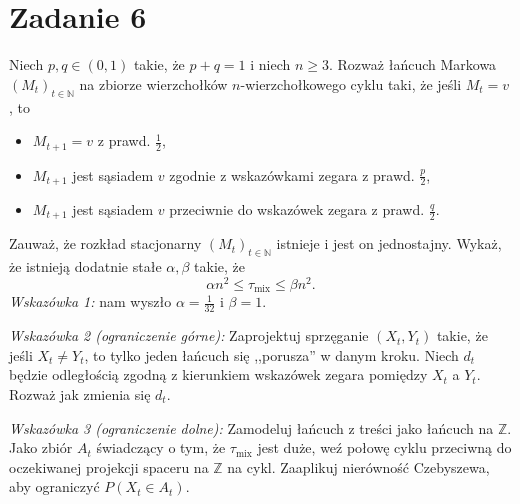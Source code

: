 \section[\nierozwiazane{Zadanie 6}]{Zadanie 6}
Niech \(p, q \in (0, 1)\) takie, że \(p + q = 1\) i niech \(n \geqslant 3\). Rozważ łańcuch Markowa
\((M_t)_{t \in \mathbb{N}}\) na zbiorze wierzchołków \(n\)-wierzchołkowego cyklu taki, że jeśli \(M_t = v\), to
\begin{itemize}
	\item \(M_{t+1} = v\) z prawd. \(\frac{1}{2}\),
	\item \(M_{t+1}\) jest sąsiadem \(v\) zgodnie z wskazówkami zegara z prawd. \(\frac{p}{2}\),
	\item \(M_{t+1}\) jest sąsiadem \(v\) przeciwnie do wskazówek zegara z prawd. \(\frac{q}{2}\).
\end{itemize}
Zauważ, że rozkład stacjonarny \((M_t)_{t \in \mathbb{N}}\) istnieje i jest on jednostajny. Wykaż, że istnieją
dodatnie stałe \(\alpha, \beta\) takie, że
\[
	\alpha n^2 \leqslant \tau_{\text{mix}} \leqslant \beta n^2.
\]
\textit{Wskazówka 1:} nam wyszło \(\alpha = \frac{1}{32}\) i \(\beta = 1\).

\textit{Wskazówka 2 (ograniczenie górne):} Zaprojektuj sprzęganie \((X_t, Y_t)\) takie, że jeśli \(X_t \neq Y_t\),
to tylko jeden łańcuch się ,,porusza'' w danym kroku. Niech \(d_t\) będzie odległością zgodną
z kierunkiem wskazówek zegara pomiędzy \(X_t\) a \(Y_t\). Rozważ jak zmienia się \(d_t\).

\textit{Wskazówka 3 (ograniczenie dolne):} Zamodeluj łańcuch z treści jako łańcuch na \(\mathbb{Z}\). Jako
zbiór \(A_t\) świadczący o tym, że \(\tau_{\text{mix}}\) jest duże, weź połowę cyklu przeciwną do oczekiwanej
projekcji spaceru na \(\mathbb{Z}\) na cykl. Zaaplikuj nierówność Czebyszewa, aby ograniczyć \(P(X_t \in A_t)\).

\brakrozwiazania
